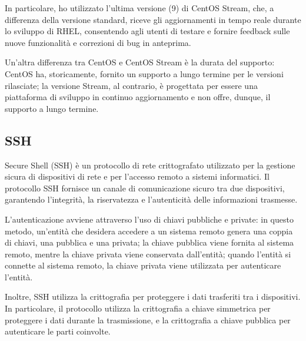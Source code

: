 In particolare, ho utilizzato l'ultima versione (9) di CentOS Stream, che, a differenza della versione standard, riceve gli aggiornamenti in tempo reale durante lo sviluppo di RHEL, consentendo agli utenti di testare e fornire feedback sulle nuove funzionalità e correzioni di bug in anteprima.

Un'altra differenza tra CentOS e CentOS Stream è la durata del supporto: CentOS ha, storicamente, fornito un supporto a lungo termine per le versioni rilasciate; la versione Stream, al contrario, è progettata per essere una piattaforma di sviluppo in continuo aggiornamento e non offre, dunque, il supporto a lungo termine.

\subsection{SSH}
Secure Shell (SSH) è un protocollo di rete crittografato utilizzato per la gestione sicura di dispositivi di rete e per l'accesso remoto a sistemi informatici. Il protocollo SSH fornisce un canale di comunicazione sicuro tra due dispositivi, garantendo l'integrità, la riservatezza e l'autenticità delle informazioni trasmesse.

L'autenticazione avviene attraverso l'uso di chiavi pubbliche e private: in questo metodo, un'entità che desidera accedere a un sistema remoto genera una coppia di chiavi, una pubblica e una privata; la chiave pubblica viene fornita al sistema remoto, mentre la chiave privata viene conservata dall'entità; quando l'entità si connette al sistema remoto, la chiave privata viene utilizzata per autenticare l'entità.

Inoltre, SSH utilizza la crittografia per proteggere i dati trasferiti tra i dispositivi. In particolare, il protocollo utilizza la crittografia a chiave simmetrica per proteggere i dati durante la trasmissione, e la crittografia a chiave pubblica per autenticare le parti coinvolte.